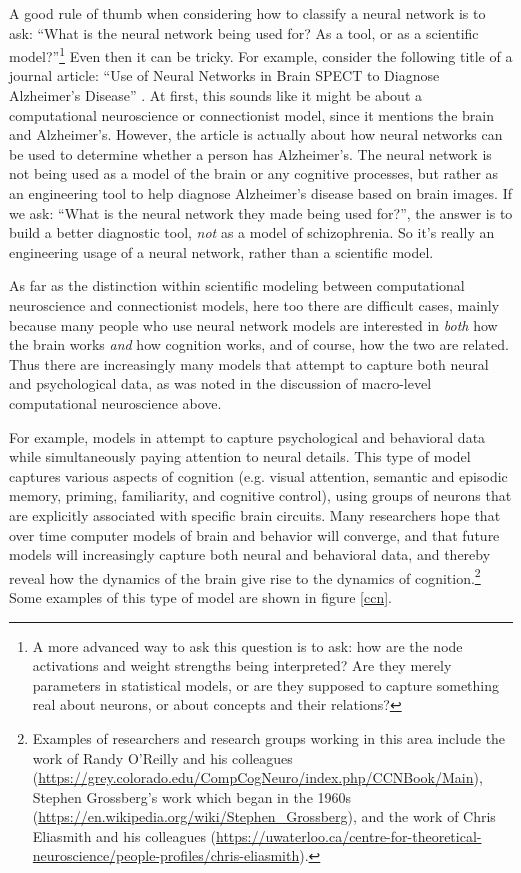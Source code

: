 A good rule of thumb when considering how to classify a neural network is to ask: ``What is the neural network being used for? As a tool, or as a scientific model?''\footnote{A more advanced way to ask this question is to ask: how are the node activations and weight strengths being interpreted? Are they merely parameters in statistical models, or are they supposed to capture something real about neurons, or about concepts and their relations?} Even then it can be tricky. For example, consider the following title of a journal article: ``Use of Neural Networks in Brain SPECT to Diagnose Alzheimer's Disease'' \cite{page1996use}. At first, this sounds like it might be about a computational neuroscience or connectionist model, since it mentions the brain and Alzheimer's. However, the article is actually about how neural networks can be used to determine whether a person has Alzheimer's. The neural network is not being used as a model of the brain or any cognitive processes, but rather as an engineering tool to help diagnose Alzheimer's disease based on brain images. If we ask: ``What is the neural network they made being used for?'', the answer is to build a better diagnostic tool, \emph{not} as a model of schizophrenia. So it's really an engineering usage of a neural network, rather than a scientific model.

As far as the distinction within scientific modeling between computational neuroscience and connectionist models, here too there are difficult cases, mainly because many people who use neural network models are interested in \emph{both} how the brain works \emph{and} how cognition works, and of course, how the two are related. Thus there are increasingly many models that attempt to capture both neural and psychological data, as was noted in the discussion of macro-level computational neuroscience above. 

For example, models in  attempt to capture psychological and behavioral data while simultaneously paying attention to neural details. This type of model captures various aspects of cognition (e.g. visual attention, semantic and episodic memory, priming, familiarity, and cognitive control), using groups of neurons that are explicitly associated with specific brain circuits. Many researchers hope that over time computer models of brain and behavior will converge, and that future models will increasingly capture both neural and behavioral data, and thereby reveal how the dynamics of the brain give rise to the dynamics of cognition.\footnote{Examples of researchers and research groups working in this area include the work of Randy O'Reilly and his colleagues (\url{https://grey.colorado.edu/CompCogNeuro/index.php/CCNBook/Main}), Stephen Grossberg's work which began in the 1960s (\url{https://en.wikipedia.org/wiki/Stephen_Grossberg}), and the work of Chris Eliasmith and his colleagues (\url{https://uwaterloo.ca/centre-for-theoretical-neuroscience/people-profiles/chris-eliasmith}).} Some examples of this type of model are shown in figure \ref{ccn}.

